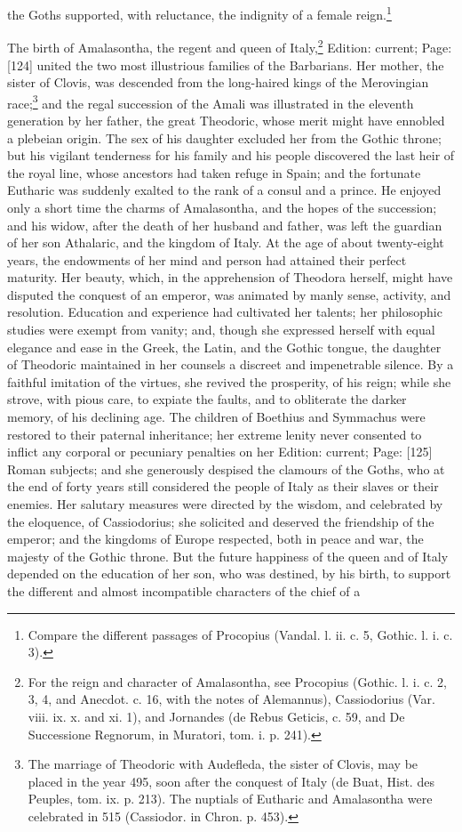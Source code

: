 the Goths supported, with reluctance, the indignity of a female reign.\footnote{Compare the different passages of Procopius (Vandal. l. ii. c. 5, Gothic. l. i. c. 3).}

The birth of Amalasontha, the regent and queen of Italy,\footnote{For the reign and character of Amalasontha, see Procopius (Gothic. l. i. c. 2, 3, 4, and Anecdot. c. 16, with the notes of Alemannus), Cassiodorius (Var. viii. ix. x. and xi. 1), and Jornandes (de Rebus Geticis, c. 59, and De Successione Regnorum, in Muratori, tom. i. p. 241).} Edition: current; Page: [124] united the two most illustrious families of the Barbarians. Her mother, the sister of Clovis, was descended from the long-haired kings of the Merovingian race;\footnote{The marriage of Theodoric with Audefleda, the sister of Clovis, may be placed in the year 495, soon after the conquest of Italy (de Buat, Hist. des Peuples, tom. ix. p. 213). The nuptials of Eutharic and Amalasontha were celebrated in 515 (Cassiodor. in Chron. p. 453).} and the regal succession of the Amali was illustrated in the eleventh generation by her father, the great Theodoric, whose merit might have ennobled a plebeian origin. The sex of his daughter excluded her from the Gothic throne; but his vigilant tenderness for his family and his people discovered the last heir of the royal line, whose ancestors had taken refuge in Spain; and the fortunate Eutharic was suddenly exalted to the rank of a consul and a prince. He enjoyed only a short time the charms of Amalasontha, and the hopes of the succession; and his widow, after the death of her husband and father, was left the guardian of her son Athalaric, and the kingdom of Italy. At the age of about twenty-eight years, the endowments of her mind and person had attained their perfect maturity. Her beauty, which, in the apprehension of Theodora herself, might have disputed the conquest of an emperor, was animated by manly sense, activity, and resolution. Education and experience had cultivated her talents; her philosophic studies were exempt from vanity; and, though she expressed herself with equal elegance and ease in the Greek, the Latin, and the Gothic tongue, the daughter of Theodoric maintained in her counsels a discreet and impenetrable silence. By a faithful imitation of the virtues, she revived the prosperity, of his reign; while she strove, with pious care, to expiate the faults, and to obliterate the darker memory, of his declining age. The children of Boethius and Symmachus were restored to their paternal inheritance; her extreme lenity never consented to inflict any corporal or pecuniary penalties on her Edition: current; Page: [125] Roman subjects; and she generously despised the clamours of the Goths, who at the end of forty years still considered the people of Italy as their slaves or their enemies. Her salutary measures were directed by the wisdom, and celebrated by the eloquence, of Cassiodorius; she solicited and deserved the friendship of the emperor; and the kingdoms of Europe respected, both in peace and war, the majesty of the Gothic throne. But the future happiness of the queen and of Italy depended on the education of her son, who was destined, by his birth, to support the different and almost incompatible characters of the chief of a 